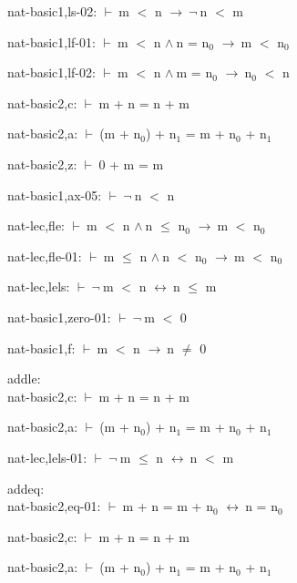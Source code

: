 \documentclass[a4paper]{article}
\newcommand{\Fol}{\mbox{$\vdash\ $}}
\newcommand{\Not}{\mbox{$\neg\ $}}
\newcommand{\And}{\mbox{$\wedge\ $}}
\newcommand{\Imp}{\mbox{$\rightarrow\ $}}
\newcommand{\Equiv}{\mbox{$\leftrightarrow\ $}}
\begin{document}
nat-basic1,ls-02: 
 \Fol m $<$ n \Imp \Not n $<$ m



nat-basic1,lf-01: 
 \Fol m $<$ n \And n = $\mbox{n}_{0}$ \Imp m $<$ $\mbox{n}_{0}$



nat-basic1,lf-02: 
 \Fol m $<$ n \And m = $\mbox{n}_{0}$ \Imp $\mbox{n}_{0}$ $<$ n



nat-basic2,c: 
 \Fol m + n = n + m



nat-basic2,a: 
 \Fol (m + $\mbox{n}_{0}$) + $\mbox{n}_{1}$ = m + $\mbox{n}_{0}$ + $\mbox{n}_{1}$



nat-basic2,z: 
 \Fol 0 + m = m



nat-basic1,ax-05: 
 \Fol \Not n $<$ n



nat-lec,fle: 
 \Fol m $<$ n \And n $\le$ $\mbox{n}_{0}$ \Imp m $<$ $\mbox{n}_{0}$



nat-lec,fle-01: 
 \Fol m $\le$ n \And n $<$ $\mbox{n}_{0}$ \Imp m $<$ $\mbox{n}_{0}$



nat-lec,lels: 
 \Fol \Not m $<$ n \Equiv n $\le$ m



nat-basic1,zero-01: 
 \Fol \Not m $<$ 0



nat-basic1,f: 
 \Fol m $<$ n \Imp n $\neq$ 0



\bigskip

addle:\\ nat-basic2,c: 
 \Fol m + n = n + m



nat-basic2,a: 
 \Fol (m + $\mbox{n}_{0}$) + $\mbox{n}_{1}$ = m + $\mbox{n}_{0}$ + $\mbox{n}_{1}$



nat-lec,lels-01: 
 \Fol \Not m $\le$ n \Equiv n $<$ m



\bigskip

addeq:\\ nat-basic2,eq-01: 
 \Fol m + n = m + $\mbox{n}_{0}$ \Equiv n = $\mbox{n}_{0}$



nat-basic2,c: 
 \Fol m + n = n + m



nat-basic2,a: 
 \Fol (m + $\mbox{n}_{0}$) + $\mbox{n}_{1}$ = m + $\mbox{n}_{0}$ + $\mbox{n}_{1}$



\bigskip
\end{document}
